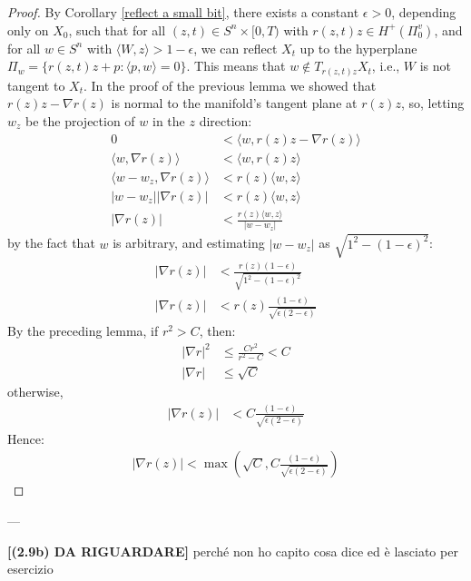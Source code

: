 \begin{proof}
		By Corollary \ref{reflect a small bit}, there exists a constant $ \epsilon > 0 $, depending only on $ X_0 $, such that for all $ (z, t) \in S^n \times [0, T) $ with $ r(z, t) z \in H^+(\Pi_0^v) $, and for all $ w \in S^n $ with $ \langle W, z \rangle > 1 - \epsilon $, we can reflect $ X_t $ up to the hyperplane $ \Pi_w = \{r(z, t) z + p : \langle p , w\rangle=0 \}$. This means that $ w \notin T_{r(z,t) z} X_t $, i.e., $ W $ is not tangent to $ X_t $. In the proof of the previous lemma we showed that $r(z) z - \nabla r(z)$ is normal to the manifold's tangent plane at $r(z) z$, so, letting $w_z$ be the projection of $w$ in the $z$ direction: 
	\begin{align*}
		0&< \langle w, r(z) z - \nabla r(z)  \rangle\\
		\langle w,  \nabla r(z)  \rangle &< \langle w, r(z) z   \rangle\\
		\langle w - w_z,  \nabla r(z)  \rangle &< r(z) \langle w,  z   \rangle\\
		|w - w_z||\nabla r(z)|  &<  r(z) \langle w,  z   \rangle\\
		|\nabla r(z)| &<  \frac{r(z) \langle w,  z   \rangle}{|w - w_z|}
	\end{align*}
	by the fact that $w$ is arbitrary, and estimating $|w - w_z|$ as $\sqrt{1^2 - (1-\epsilon)^2}$:
	\begin{align*}
		|\nabla r(z)|  &<\frac{r(z) (1-\epsilon)}{\sqrt{1^2 - (1-\epsilon)^2}}\\
		|\nabla r(z)|  &<r(z)\frac{ (1-\epsilon)}{\sqrt{\epsilon (2-\epsilon)}}
	\end{align*}
	By the preceding lemma, if $ r^2 > C $, then:
	\begin{align*}
		|\nabla r|^2 &\leq \frac{C r^2}{r^2 - C} < C\\
		|\nabla r| &\leq \sqrt{C}
	\end{align*}
	otherwise, 
	\begin{align*}
		|\nabla r(z)|  &<C\frac{ (1-\epsilon)}{\sqrt{\epsilon (2-\epsilon)}}
	\end{align*}
	Hence:
	\begin{align*}
		|\nabla r(z)| < \max\left(\sqrt{C}, C\frac{ (1-\epsilon)}{\sqrt{\epsilon (2-\epsilon)}}\right)
	\end{align*} 
\end{proof}
---

{\LARGE \textbf{[(2.9b) DA RIGUARDARE]}} perché non ho capito cosa dice ed è lasciato per esercizio
